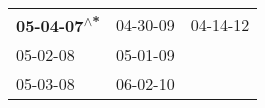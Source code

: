 \begin{supertabular}{lll}
 \textbf{05-04-07\textsuperscript{$\wedge$*}} &  04-30-09\textsuperscript{} &  04-14-12\textsuperscript{} \\
                   05-02-08\textsuperscript{} &  05-01-09\textsuperscript{} &                             \\
                   05-03-08\textsuperscript{} &  06-02-10\textsuperscript{} &                             \\
\end{supertabular}

